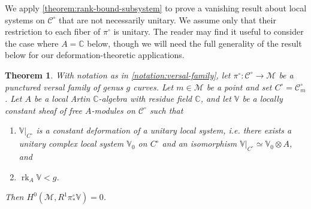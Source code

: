\documentclass[12 pt]{amsart}
\theoremstyle{plain}
\newtheorem{theorem}[subsubsection]{Theorem}
\theoremstyle{definition}
\theoremstyle{remark}
\numberwithin{equation}{section}
\DeclareMathOperator\rk{rk}
\begin{document}
We apply \autoref{theorem:rank-bound-subsystem} to prove a vanishing result about local systems on $\mathscr{C}^\circ$ that are not necessarily unitary. We assume only that their restriction to each fiber of $\pi^\circ$ is unitary. The reader may find it useful to consider the case where $A=\mathbb{C}$ below, though we will need the full generality of the result below for our deformation-theoretic applications.
\begin{theorem}
	\label{theorem:unitary-rigid}
	With notation as in \autoref{notation:versal-family}, 
	let $\pi^\circ: \mathscr{C}^\circ\to \mathscr{M}$ be a punctured versal
	family of genus $g$ curves. Let $m\in \mathscr{M}$ be a point and set $C^\circ
	= \mathscr C^\circ_m$. Let $A$ be a local Artin $\mathbb{C}$-algebra with residue field $\mathbb{C}$, and let $\mathbb V$ be a locally constant sheaf of free $A$-modules on $\mathscr C^\circ$
	such that
	\begin{enumerate}
 \item $\mathbb V|_{C^\circ}$ is a constant deformation of a unitary local system, i.e. there exists a unitary complex local system $\mathbb{V}_0$ on $C^\circ$ and an isomorphism $\mathbb V|_{C^\circ}\simeq \mathbb{V}_0\otimes A$, and
\item $\rk_A \mathbb V < g$.
		\end{enumerate}
 Then
	$H^0(\mathscr M, R^1 \pi^\circ_* \mathbb V) = 0$.
\end{theorem}
\end{document}
